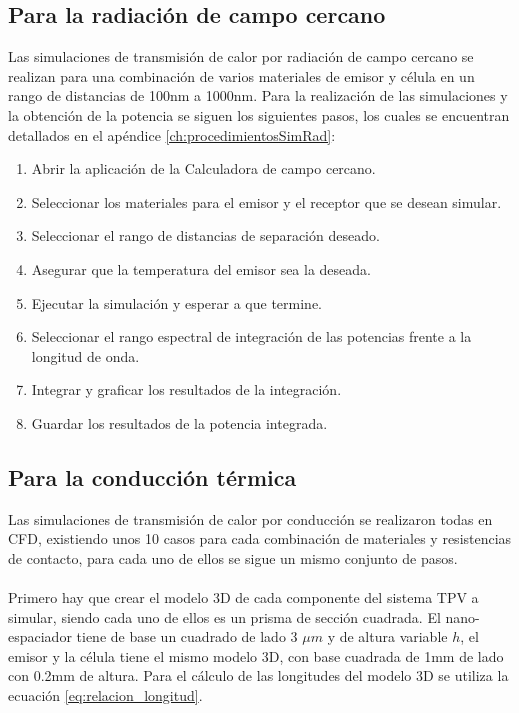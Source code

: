 \subsection{Para la radiación de campo cercano}
Las simulaciones de transmisión de calor por radiación de campo cercano se realizan para una combinación de varios materiales de emisor y célula en un rango de distancias de 100nm a 1000nm. Para la realización de las simulaciones y la obtención de la potencia se siguen los siguientes pasos, los cuales se encuentran detallados en el apéndice \ref{ch:procedimientosSimRad}:
\begin{enumerate}
	\item Abrir la aplicación de la Calculadora de campo cercano.
	\item Seleccionar los materiales para el emisor y el receptor que se desean simular. 
	\item Seleccionar el rango de distancias de separación deseado.
	\item Asegurar que la temperatura del emisor sea la deseada.
	\item Ejecutar la simulación y esperar a que termine.
	\item Seleccionar el rango espectral de integración de las potencias frente a la longitud de onda.
	\item Integrar y graficar los resultados de la integración.
	\item Guardar los resultados de la potencia integrada.
\end{enumerate}
\subsection{Para la conducción térmica}
Las simulaciones de transmisión de calor por conducción se realizaron todas en CFD, existiendo unos 10 casos para cada combinación de materiales y resistencias de contacto, para cada uno de ellos se sigue un mismo conjunto de pasos. \\\\
Primero hay que crear el modelo 3D de cada componente del sistema TPV a simular, siendo cada uno de ellos es un prisma de sección cuadrada. El nano-espaciador tiene de base un cuadrado de lado 3 $\mu m$ y de altura variable $h$, el emisor y la célula tiene el mismo modelo 3D, con base cuadrada de 1mm de lado con 0.2mm de altura. Para el cálculo de las longitudes del modelo 3D se utiliza la ecuación \eqref{eq:relacion_longitud}.
